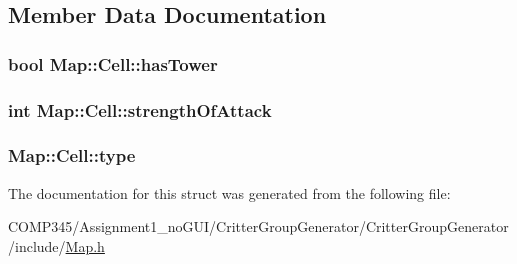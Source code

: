 \subsection{Member Data Documentation}
\hypertarget{struct_map_1_1_cell_a3f2e341ce722e5f95ae4ddb2db1b7164}{
\subsubsection[{has\+Tower}]{\setlength{\rightskip}{0pt plus 5cm}bool Map\+::\+Cell\+::has\+Tower}}\label{struct_map_1_1_cell_a3f2e341ce722e5f95ae4ddb2db1b7164}
\hypertarget{struct_map_1_1_cell_a46cdedee9b275a54df5fbf6c1e18650b}{
\subsubsection[{strength\+Of\+Attack}]{\setlength{\rightskip}{0pt plus 5cm}int Map\+::\+Cell\+::strength\+Of\+Attack}}\label{struct_map_1_1_cell_a46cdedee9b275a54df5fbf6c1e18650b}
\hypertarget{struct_map_1_1_cell_adab6ad663eeda4c1fe349ea2f87598e0}{
\subsubsection[{type}]{ Map\+::\+Cell\+::type}}\label{struct_map_1_1_cell_adab6ad663eeda4c1fe349ea2f87598e0}


The documentation for this struct was generated from the following file\+:\begin{DoxyCompactItemize}
\item 
C\+O\+M\+P345/\+Assignment1\+\_\+no\+G\+U\+I/\+Critter\+Group\+Generator/\+Critter\+Group\+Generator/include/\hyperlink{_map_8h}{Map.\+h}\end{DoxyCompactItemize}
